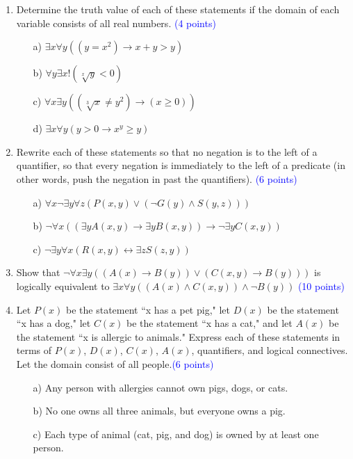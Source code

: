 \documentclass{article}
\newcommand{\pt}[1]{\textcolor{blue}{(#1 points)}}
\begin{document}
\begin{enumerate}
\begin{enumerate}
    \end{enumerate}
    
    \item Determine the truth value of each of these statements if the domain of each variable consists of all real numbers. \pt{4}
    \begin{enumerate}
        \item[a)] $\exists x \forall y((y = x^2) \rightarrow x + y > y)$\\
        \item[b)] $\forall y \exists x !(\sqrt[x]{y} < 0)$\\
        \item[c)] $\forall x \exists y((\sqrt[3]{x} \neq y^2) \rightarrow (x \geq 0))$\\
        \item[d)] $\exists x \forall y(y > 0 \rightarrow x^y \geq y)$
    \end{enumerate}
    
    \item Rewrite each of these statements so that no negation is to the left of a quantifier, so that every negation is immediately to the left of a predicate (in other words, push the negation in past the quantifiers). \pt{6}\\
    \begin{enumerate}
        \item[a)] $\forall x \neg \exists y \forall z (P(x, y) \lor (\lnot G(y) \land S(y, z)))$\\
        \item[b)] $\neg \forall x (( \exists y A(x, y) \rightarrow \exists y B(x, y)) \rightarrow \neg \exists y C(x, y)) $\\
        \item[c)] $\neg  \exists y \forall x (R(x,y) \leftrightarrow \exists z S(z,y))$\\
    \end{enumerate}
    
    
    \item Show that $\neg \forall x \exists y ((A(x) \rightarrow B(y)) \lor (C(x, y) \rightarrow B(y)))$ is logically equivalent to $\exists x \forall y ((A(x) \land C(x, y)) \land \neg B(y))$ \pt{10}\\
    
    \item Let $P(x)$ be the statement ``x has a pet pig," let $D(x)$ be the statement ``x has a dog," let $C(x)$ be the statement ``x has a cat," and let $A(x)$ be the statement ``x is allergic to animals." Express each of these statements in terms of $P(x)$, $D(x)$, $C(x)$, $A(x)$, quantifiers, and logical connectives. Let the domain consist of all people.\pt{6}
    \begin{enumerate}
        \item[a)] Any person with allergies cannot own pigs, dogs, or cats.
        \item[b)] No one owns all three animals, but everyone owns a pig.
        \item[c)] Each type of animal (cat, pig, and dog) is owned by at least one person.
    \end{enumerate}
    

\end{enumerate}
\end{document}
